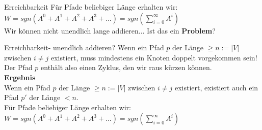 \begin{frame}{Erreichbarkeit}
	Für Pfade beliebiger Länge erhalten wir:
	$W = sgn(A^0 + A^1 + A^2 + A^3 + ...) = sgn(\sum\limits_{i=0}^{\infty} A^i)$\\
	\pause
	Wir können nicht unendlich lange addieren... Ist das ein \textbf{Problem}? 
\end{frame}

\begin{frame}{Erreichbarkeit- unendlich addieren?}
	\ip Wenn ein Pfad $p$ der Länge $ \geq n := |V|$ zwischen $i \neq j$ existiert, muss mindestens ein Knoten doppelt vorgekommen sein! \ip Der Pfad $p$ enthält also einen Zyklus, den wir raus kürzen können.\\\p
	\vspace{0.15cm}
	\textbf{Ergebnis}\\
	Wenn ein Pfad $p$ der Länge $\geq n := |V|$ zwischen $i \neq j$ existiert, existiert auch ein Pfad $p'$ der Länge $< n$.\\\p
	\vspace{0.4cm}
	Für Pfade beliebiger Länge erhalten wir:
	$W = sgn(A^0 + A^1 + A^2 + A^3 + ...) = sgn(\sum\limits_{i=0}^{\infty} A^i)$  \\
\end{frame}

